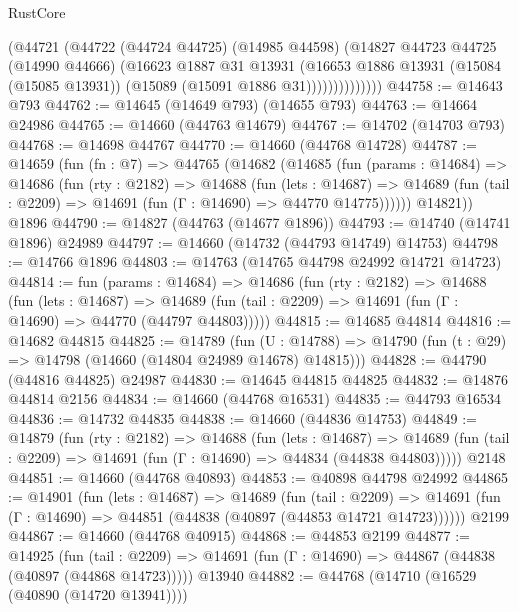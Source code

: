 \begin{lexlean}{RustCore}
\begin{coremodule}
                  (@44721
                    (@44722
                      (@44724 @44725)
                      (@14985 @44598)
                      (@14827
                        @44723
                        @44725
                        (@14990 @44666)
                        (@16623
                          @1887
                          @31
                          @13931
                          (@16653
                            @1886
                            @13931
                            (@15084 (@15085 @13931))
                            (@15089 (@15091 @1886 @31))))))))))))))
@44758 := @14643 @793
@44762 := @14645 (@14649 @793) (@14655 @793)
@44763 := @14664 @24986
@44765 := @14660 (@44763 @14679)
@44767 := @14702 (@14703 @793)
@44768 := @14698 @44767
@44770 := @14660 (@44768 @14728)
@44787 := @14659
    (fun (fn : @7) =>
    @44765
      (@14682
        (@14685
          (fun (params : @14684) =>
          @14686
            (fun (rty : @2182) =>
            @14688
              (fun (lets : @14687) =>
              @14689 (fun (tail : @2209) => @14691 (fun (Γ : @14690) => @44770 @14775))))))
        @14821))
    @1896
@44790 := @14827 (@44763 (@14677 @1896))
@44793 := @14740 (@14741 @1896) @24989
@44797 := @14660 (@14732 (@44793 @14749) @14753)
@44798 := @14766 @1896
@44803 := @14763 (@14765 @44798 @24992 @14721 @14723)
@44814 := fun (params : @14684) =>
  @14686
    (fun (rty : @2182) =>
    @14688
      (fun (lets : @14687) =>
      @14689 (fun (tail : @2209) => @14691 (fun (Γ : @14690) => @44770 (@44797 @44803)))))
@44815 := @14685 @44814
@44816 := @14682 @44815
@44825 := @14789
    (fun (U : @14788) => @14790 (fun (t : @29) => @14798 (@14660 (@14804 @24989 @14678) @14815)))
@44828 := @44790 (@44816 @44825) @24987
@44830 := @14645 @44815 @44825
@44832 := @14876 @44814 @2156
@44834 := @14660 (@44768 @16531)
@44835 := @44793 @16534
@44836 := @14732 @44835
@44838 := @14660 (@44836 @14753)
@44849 := @14879
    (fun (rty : @2182) =>
    @14688
      (fun (lets : @14687) =>
      @14689 (fun (tail : @2209) => @14691 (fun (Γ : @14690) => @44834 (@44838 @44803)))))
    @2148
@44851 := @14660 (@44768 @40893)
@44853 := @40898 @44798 @24992
@44865 := @14901
    (fun (lets : @14687) =>
    @14689
      (fun (tail : @2209) =>
      @14691 (fun (Γ : @14690) => @44851 (@44838 (@40897 (@44853 @14721 @14723))))))
    @2199
@44867 := @14660 (@44768 @40915)
@44868 := @44853 @2199
@44877 := @14925
    (fun (tail : @2209) => @14691 (fun (Γ : @14690) => @44867 (@44838 (@40897 (@44868 @14723)))))
    @13940
@44882 := @44768 (@14710 (@16529 (@40890 (@14720 @13941))))

\end{coremodule}
\end{lexlean}
